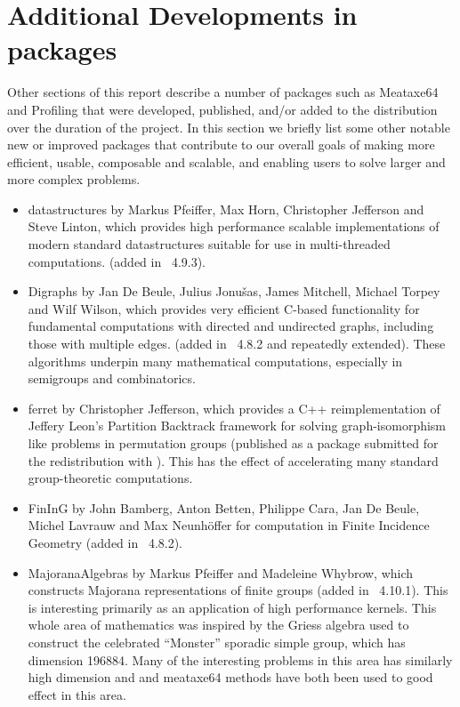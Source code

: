 \section{Additional Developments in \GAP packages} \label{sec:packages}

Other sections of this report describe
a number of \GAP packages such as Meataxe64 and Profiling that were developed, published,
and/or added to the \GAP distribution over the duration of the project.  In this section
we briefly list some other notable new or improved packages that
contribute to our overall goals of making \GAP more efficient, usable,
composable and scalable, and enabling users to solve larger and more
complex problems.

\begin{itemize}

\item
{\sf datastructures} \cite{datastructures} by Markus Pfeiffer, Max Horn, 
Christopher Jefferson and Steve Linton, which provides high
performance scalable implementations of modern standard datastructures
suitable for use in multi-threaded computations. (added in \GAP~4.9.3).

\item
{\sf Digraphs} by Jan De Beule, Julius Jonu\v{s}as, James Mitchell,
Michael Torpey and Wilf Wilson, which provides very efficient C-based
functionality for fundamental computations with directed and
undirected graphs, including those with multiple edges. (added in
\GAP~4.8.2 and repeatedly extended).  These algorithms underpin many
mathematical computations, especially in semigroups and combinatorics.

\item
{\sf ferret}  by Christopher Jefferson, which provides a C++
reimplementation of Jeffery Leon's Partition Backtrack framework for
solving graph-isomorphism like problems in permutation groups
(published as a package submitted for the redistribution with
\GAP). This has the effect of accelerating many standard
group-theoretic computations.

\item
{\sf FinInG} by John Bamberg, Anton Betten, Philippe Cara, Jan De
Beule, Michel Lavrauw and Max Neunh\"offer for computation in Finite
Incidence Geometry (added in \GAP~4.8.2).

\item
{\sf MajoranaAlgebras} by Markus Pfeiffer and Madeleine Whybrow, which
constructs Majorana representations of finite groups (added in
\GAP~4.10.1). This is interesting primarily as an application of high
performance kernels. This whole area of mathematics was inspired by
the Griess algebra used to construct the celebrated ``Monster''
sporadic simple group, which has dimension 196884. Many of the
interesting problems in this area has similarly high dimension and
\HPCGAP and meataxe64 methods have both been used to good effect in
this area.
%
%


\end{itemize}
